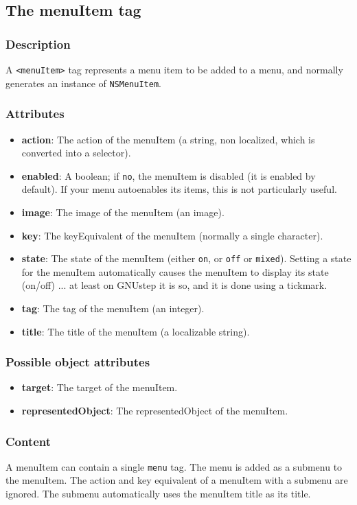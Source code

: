 \subsection{The menuItem tag}

\subsubsection{Description}
A \texttt{<menuItem>} tag represents a menu item to be added to a menu,
and normally generates an instance of \texttt{NSMenuItem}.

\subsubsection{Attributes}
\begin{itemize}
\item {\bf action}: The action of the menuItem (a string, non localized, 
which is converted into a selector).
\item {\bf enabled}: A boolean; if \texttt{no}, the menuItem is disabled (it
is enabled by default).  If your menu autoenables its items, this is not
particularly useful.
\item {\bf image}: The image of the menuItem (an image).
\item {\bf key}: The keyEquivalent of the menuItem (normally a single character).
\item {\bf state}: The state of the menuItem (either \texttt{on}, or \texttt{off} 
or \texttt{mixed}).  Setting a state for the menuItem automatically
causes the menuItem to display its state (on/off) ... at least on
GNUstep it is so, and it is done using a tickmark.
\item {\bf tag}: The tag of the menuItem (an integer).
\item {\bf title}: The title of the menuItem (a localizable string).
\end{itemize}

\subsubsection{Possible object attributes}
\begin{itemize}
\item {\bf target}: The target of the menuItem.
\item {\bf representedObject}: The representedObject of the menuItem.
\end{itemize}

\subsubsection{Content}
A menuItem can contain a single \texttt{menu} tag.  The menu is added
as a submenu to the menuItem.  The action and key equivalent of a
menuItem with a submenu are ignored.  The submenu automatically uses
the menuItem title as its title.

